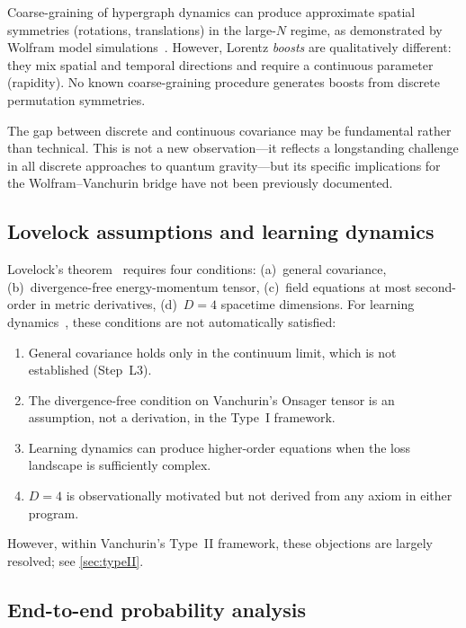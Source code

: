 \documentclass[11pt]{article}
\theoremstyle{definition}
\theoremstyle{remark}
\begin{document}
Coarse-graining of hypergraph dynamics can produce approximate spatial
symmetries (rotations, translations) in the large-$N$ regime, as
demonstrated by Wolfram model simulations~\cite{Wolfram2020}.
However, Lorentz \emph{boosts} are qualitatively different: they mix
spatial and temporal directions and require a continuous parameter
(rapidity).
No known coarse-graining procedure generates boosts from discrete
permutation symmetries.

The gap between discrete and continuous covariance may be fundamental
rather than technical.
This is not a new observation---it reflects a longstanding challenge in
all discrete approaches to quantum gravity---but its specific implications
for the Wolfram--Vanchurin bridge have not been previously documented.

\subsection{Lovelock assumptions and learning dynamics}
\label{sec:lovelock-learning}

Lovelock's theorem~\cite{Lovelock1971} requires four conditions:
(a)~general covariance, (b)~divergence-free energy-momentum tensor,
(c)~field equations at most second-order in metric derivatives,
(d)~$D = 4$ spacetime dimensions.
For learning dynamics~\cite{Vanchurin2020,Vanchurin2025}, these conditions
are not automatically satisfied:

\begin{enumerate}
\item General covariance holds only in the continuum limit, which is not
  established (Step~L3).
\item The divergence-free condition on Vanchurin's Onsager tensor is an
  assumption, not a derivation, in the Type~I framework.
\item Learning dynamics can produce higher-order equations when the loss
  landscape is sufficiently complex.
\item $D = 4$ is observationally motivated but not derived from any axiom
  in either program.
\end{enumerate}

However, within Vanchurin's Type~II framework, these objections are
largely resolved; see \cref{sec:typeII}.

\subsection{End-to-end probability analysis}
\label{sec:probability-analysis}
\end{document}
